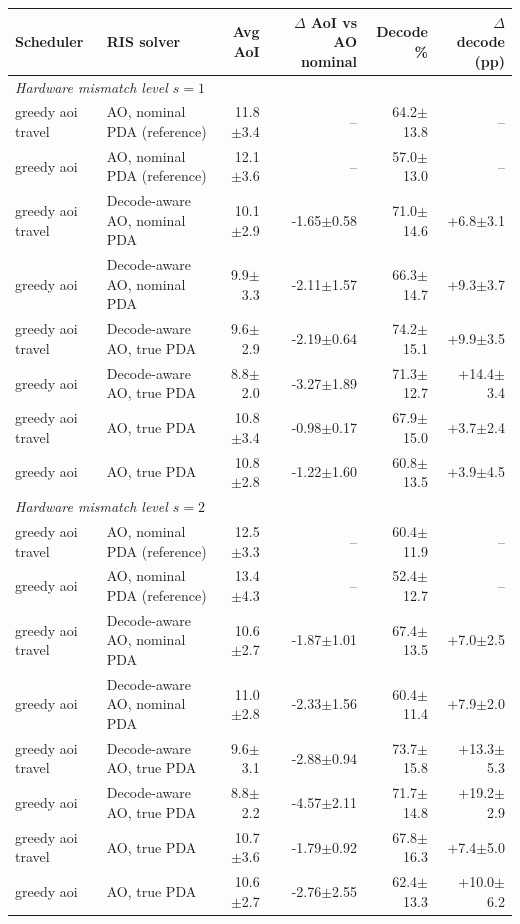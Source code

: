 \begin{tabular}{llrrrr}
\toprule
Scheduler & RIS solver & Avg AoI & $\Delta$ AoI vs AO nominal & Decode \% & $\Delta$ decode (pp) \\
\midrule
\multicolumn{6}{l}{\textit{Hardware mismatch level $s=1$}} \\
greedy aoi travel & AO, nominal PDA (reference) & 11.8$\pm$3.4 & -- & 64.2$\pm$13.8 & -- \\
greedy aoi & AO, nominal PDA (reference) & 12.1$\pm$3.6 & -- & 57.0$\pm$13.0 & -- \\
greedy aoi travel & Decode-aware AO, nominal PDA & 10.1$\pm$2.9 & -1.65$\pm$0.58 & 71.0$\pm$14.6 & +6.8$\pm$3.1 \\
greedy aoi & Decode-aware AO, nominal PDA & 9.9$\pm$3.3 & -2.11$\pm$1.57 & 66.3$\pm$14.7 & +9.3$\pm$3.7 \\
greedy aoi travel & Decode-aware AO, true PDA & 9.6$\pm$2.9 & -2.19$\pm$0.64 & 74.2$\pm$15.1 & +9.9$\pm$3.5 \\
greedy aoi & Decode-aware AO, true PDA & 8.8$\pm$2.0 & -3.27$\pm$1.89 & 71.3$\pm$12.7 & +14.4$\pm$3.4 \\
greedy aoi travel & AO, true PDA & 10.8$\pm$3.4 & -0.98$\pm$0.17 & 67.9$\pm$15.0 & +3.7$\pm$2.4 \\
greedy aoi & AO, true PDA & 10.8$\pm$2.8 & -1.22$\pm$1.60 & 60.8$\pm$13.5 & +3.9$\pm$4.5 \\
\midrule
\multicolumn{6}{l}{\textit{Hardware mismatch level $s=2$}} \\
greedy aoi travel & AO, nominal PDA (reference) & 12.5$\pm$3.3 & -- & 60.4$\pm$11.9 & -- \\
greedy aoi & AO, nominal PDA (reference) & 13.4$\pm$4.3 & -- & 52.4$\pm$12.7 & -- \\
greedy aoi travel & Decode-aware AO, nominal PDA & 10.6$\pm$2.7 & -1.87$\pm$1.01 & 67.4$\pm$13.5 & +7.0$\pm$2.5 \\
greedy aoi & Decode-aware AO, nominal PDA & 11.0$\pm$2.8 & -2.33$\pm$1.56 & 60.4$\pm$11.4 & +7.9$\pm$2.0 \\
greedy aoi travel & Decode-aware AO, true PDA & 9.6$\pm$3.1 & -2.88$\pm$0.94 & 73.7$\pm$15.8 & +13.3$\pm$5.3 \\
greedy aoi & Decode-aware AO, true PDA & 8.8$\pm$2.2 & -4.57$\pm$2.11 & 71.7$\pm$14.8 & +19.2$\pm$2.9 \\
greedy aoi travel & AO, true PDA & 10.7$\pm$3.6 & -1.79$\pm$0.92 & 67.8$\pm$16.3 & +7.4$\pm$5.0 \\
greedy aoi & AO, true PDA & 10.6$\pm$2.7 & -2.76$\pm$2.55 & 62.4$\pm$13.3 & +10.0$\pm$6.2 \\
\bottomrule
\end{tabular}
